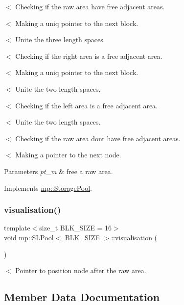 $<$ Checking if the raw area have free adjacent areas.

$<$ Making a uniq pointer to the next block.

$<$ Unite the three length spaces.

$<$ Checking if the right area is a free adjacent area.

$<$ Making a uniq pointer to the next block.

$<$ Unite the two length spaces.

$<$ Checking if the left area is a free adjacent area.

$<$ Unite the two length spaces.

$<$ Checking if the raw area dont have free adjacent areas.

$<$ Making a pointer to the next node. 
\begin{DoxyParams}{Parameters}
{\em pt\+\_\+m} & free a raw area. \\
\hline
\end{DoxyParams}


Implements \hyperlink{classmp_1_1_storage_pool_a5a186404980f6c958a30373f810ebd4f}{mp\+::\+Storage\+Pool}.

\mbox{\label{classmp_1_1_s_l_pool_a6770602574612fd2ef47bf474c0797bc}} 
\subsubsection{\texorpdfstring{visualisation()}{visualisation()}}
{\footnotesize\ttfamily template$<$size\+\_\+t B\+L\+K\+\_\+\+S\+I\+ZE = 16$>$ \\
void \hyperlink{classmp_1_1_s_l_pool}{mp\+::\+S\+L\+Pool}$<$ B\+L\+K\+\_\+\+S\+I\+ZE $>$\+::visualisation (\begin{DoxyParamCaption}{ }\end{DoxyParamCaption})\hspace{0.3cm}{\ttfamily [inline]}}

$<$ Pointer to position node after the raw area. 

\subsection{Member Data Documentation}
\mbox{\label{classmp_1_1_s_l_pool_a9713b7eaf26afed603cab879a2144dbf}} 
